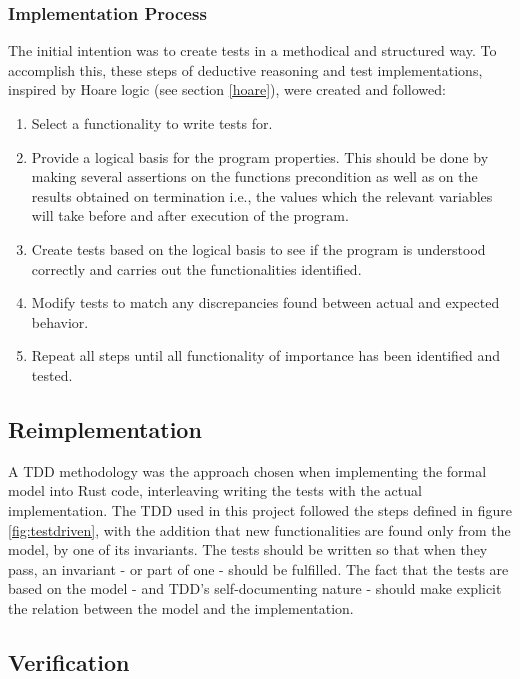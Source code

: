 \newpage

\subsubsection{Implementation Process}\label{implproc}

The initial intention was to create tests in a methodical and structured way. To accomplish this, these steps of deductive reasoning and test implementations, inspired by Hoare logic (see section \ref{hoare}), were created and followed:

\begin{enumerate}
  \item Select a functionality to write tests for.
  \item Provide a logical basis for the program properties. This should be done by making several assertions on the functions precondition as well as on the results obtained on termination i.e., the values which the relevant variables will take before and after execution of the program. 
  \item Create tests based on the logical basis to see if the program is understood correctly and carries out the functionalities identified.
  \item Modify tests to match any discrepancies found between actual and expected behavior.
  \item Repeat all steps until all functionality of importance has been identified and tested.
\end{enumerate}


\subsection{Reimplementation}\label{reimpl}
A TDD methodology was the approach chosen when implementing the formal model into Rust code, interleaving writing the tests with the actual implementation. The TDD used in this project followed the steps defined in figure \ref{fig:testdriven}, with the addition that new functionalities are found only from the model, by one of its invariants. The tests should be written so that when they pass, an invariant - or part of one - should be fulfilled. The fact that the tests are based on the model - and TDD's self-documenting nature - should make explicit the relation between the model and the implementation.

\subsection{Verification}\label{verification}

